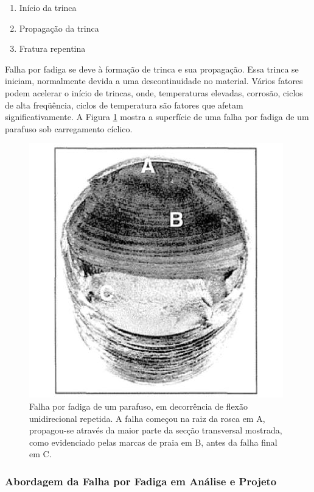 \begin{enumerate}
	\item Início da trinca
	\item Propagação da trinca
	\item Fratura repentina
\end{enumerate}

Falha por fadiga se deve à formação de trinca e sua propagação. Essa trinca se iniciam, normalmente devida a uma descontinuidade no material. Vários fatores podem acelerar o início de trincas, onde, temperaturas elevadas, corrosão, ciclos de alta freqüência, ciclos de temperatura são fatores que afetam significativamente. A Figura \ref{parafuso-fadiga} mostra a superfície de uma falha por fadiga de um parafuso sob carregamento cíclico.

\begin{figure}[h]
\centering
\includegraphics[scale=0.4]{figuras/parafuso_fadiga.jpg}
\caption{Falha por fadiga de um parafuso, em decorrência de flexão unidirecional repetida. A falha começou na raiz da rosca em A, propagou-se através da maior parte da secção transversal mostrada, como evidenciado pelas marcas de praia em B, antes da falha final em C.}
\label{parafuso-fadiga}
\end{figure}

\subsubsection{Abordagem da Falha por Fadiga em Análise e Projeto}

